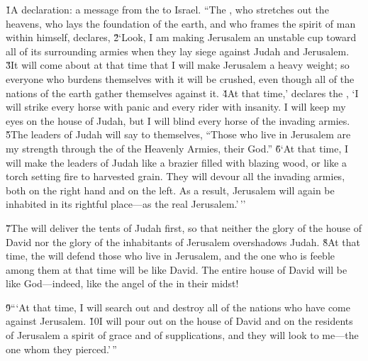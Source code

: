 \v{1}A declaration: a message from the  to Israel. ``The , who stretches out the heavens, who lays the foundation of the earth, and who frames the spirit of man within himself, declares, \v{2}`Look, I am making Jerusalem an unstable cup toward all of its surrounding armies when they lay siege against Judah and Jerusalem. \v{3}It will come about at that time that I will make Jerusalem a heavy weight; so everyone who burdens themselves with it will be crushed, even though all of the nations of the earth gather themselves against it. \v{4}At that time,' declares the , `I will strike every horse with panic and every rider with insanity. I will keep my eyes on the house of Judah, but I will blind every horse of the invading armies. \v{5}The leaders of Judah will say to themselves, ``Those who live in Jerusalem are my strength through the  of the Heavenly Armies, their God.'' \v{6}`At that time, I will make the leaders of Judah like a brazier filled with blazing wood, or like a torch setting fire to harvested grain. They will devour all the invading armies, both on the right hand and on the left. As a result, Jerusalem will again be inhabited in its rightful place---as the real Jerusalem.'\,''

\v{7}The  will deliver the tents of Judah first, so that neither the glory of the house of David nor the glory of the inhabitants of Jerusalem overshadows Judah. \v{8}At that time, the  will defend those who live in Jerusalem, and the one who is feeble among them at that time will be like David. The entire house of David will be like God---indeed, like the angel of the  in their midst!

\v{9}```At that time, I will search out and destroy all of the nations who have come against Jerusalem. \v{10}I will pour out on the house of David and on the residents of Jerusalem a spirit of grace and of supplications, and they will look to me---the one whom they pierced.'\,''


